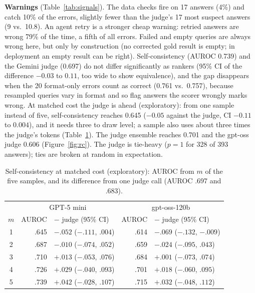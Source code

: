 \documentclass[conference]{IEEEtran}
\begin{document}
\textbf{Warnings} (Table~\ref{tab:signals}). The data checks fire on 17 answers (4\%) and catch 10\%
of the errors, slightly fewer than the judge's 17 most suspect answers (9 vs.\ 10.8). An agent retry
is a stronger cheap warning: retried answers are wrong 79\% of the time, a fifth of all errors. Failed
and empty queries are always wrong here, but only by construction (no corrected gold result is empty;
in deployment an empty result can be right). Self-consistency (AUROC 0.739) and the Gemini judge
(0.697) do not differ significantly as rankers (95\% CI of the difference $-0.03$ to $0.11$, too wide to show
equivalence), and the gap disappears when the 20 format-only errors count as correct (0.761 vs.\ 0.757), because resampled
queries vary in format and so flag answers the scorer wrongly marks wrong. At matched cost the judge
is ahead (exploratory): from one sample instead of five, self-consistency reaches 0.645 ($-0.05$ against
the judge, CI $-0.11$ to $0.004$), and it needs three to draw level; a sample also uses about three times
the judge's tokens (Table~\ref{tab:cost}). The judge ensemble reaches
0.701 and the gpt-oss judge 0.606 (Figure~\ref{fig:rc}). The judge is tie-heavy ($p=1$ for 328 of 393
answers); ties are broken at random in expectation.

\begin{table}[t]
\centering\footnotesize
\setlength{\tabcolsep}{2pt}
\begin{tabular}{crlrl}
\toprule
 & \multicolumn{2}{c}{GPT-5 mini} & \multicolumn{2}{c}{gpt-oss-120b} \\
$m$ & AUROC & $-$ judge (95\% CI) & AUROC & $-$ judge (95\% CI) \\
\midrule
1 & .645 & $-.052$ ($-.111$, $.004$) & .614 & $-.069$ ($-.132$, $-.009$) \\
2 & .687 & $-.010$ ($-.074$, $.052$) & .659 & $-.024$ ($-.095$, $.043$) \\
3 & .710 & $+.013$ ($-.053$, $.076$) & .684 & $+.001$ ($-.073$, $.074$) \\
4 & .726 & $+.029$ ($-.040$, $.093$) & .701 & $+.018$ ($-.060$, $.095$) \\
5 & .739 & $+.042$ ($-.028$, $.107$) & .715 & $+.032$ ($-.048$, $.112$) \\
\bottomrule
\end{tabular}
\caption{Self-consistency at matched cost (exploratory): AUROC from $m$ of the five samples, and its
difference from one judge call (AUROC .697 and .683).}
\label{tab:cost}
\end{table}
\end{document}
